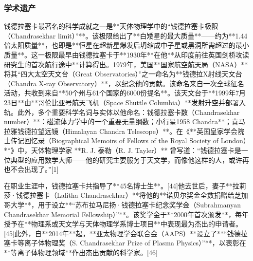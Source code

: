 \subsubsection{学术遗产}
钱德拉塞卡最著名的科学成就之一是**天体物理学中的“钱德拉塞卡极限（Chandrasekhar limit）”**。该极限给出了**白矮星的最大质量**——约为**1.44倍太阳质量**，也即是**恒星在超新星爆发后坍缩成中子星或黑洞所需超过的最小质量**。这一极限最早由钱德拉塞卡于**1930年**在他**从印度前往英国剑桥攻读研究生的首次航行途中**计算得出。1979年，美国**国家航空航天局（NASA）**将其“四大太空天文台（Great Observatories）”之一命名为**钱德拉X射线天文台（Chandra X-ray Observatory）**，以纪念他的贡献。该命名来自一次全球征名活动，共收到来自**50个州与61个国家的6000份提名**。该天文台于**1999年7月23日**由**哥伦比亚号航天飞机（Space Shuttle Columbia）**发射升空并部署入轨。此外，多个重要科学名词与实体以他命名：钱德拉塞卡数（Chandrasekhar number）**：磁流体力学中的一个重要无量纲数；小行星1958 Chandra**；喜马拉雅钱德拉望远镜（Himalayan Chandra Telescope）**。在《**英国皇家学会院士传记回忆录（Biographical Memoirs of Fellows of the Royal Society of London）**》中，天体物理学家 **R. J. 泰勒（R. J. Tayler）** 曾写道：“钱德拉塞卡是一位典型的应用数学大师——他的研究主要服务于天文学，而像他这样的人，或许再也不会出现了。”[1]

在职业生涯中，钱德拉塞卡共指导了**45名博士生**。[44]他去世后，妻子**拉莉莎·钱德拉塞卡（Lalitha Chandrasekhar）**将他的**诺贝尔奖金全数捐赠给芝加哥大学**，用于设立**“苏布拉马尼扬·钱德拉塞卡纪念奖学金（Subrahmanyan Chandrasekhar Memorial Fellowship）”**。该奖学金于**2000年首次颁发**，每年授予在**物理系或天文学与天体物理学系博士项目**中表现最为杰出的申请者。[45]此外，自**2014年**起，**亚太物理学会联合会（AAPS）**设立了**“钱德拉塞卡等离子体物理奖（S. Chandrasekhar Prize of Plasma Physics）”**，以表彰在**等离子体物理领域**作出杰出贡献的科学家。[46]
